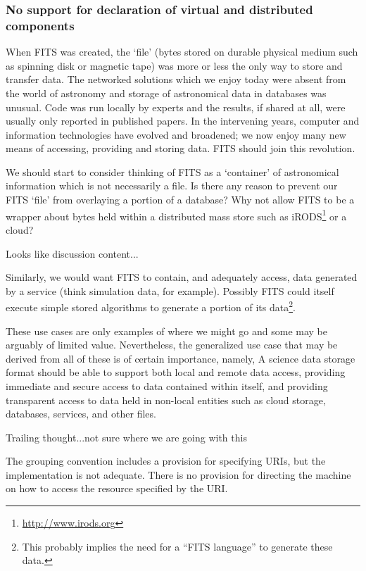 \documentclass[final,authoryear,5p,times,twocolumn]{elsarticle}
\begin{document}
{{\subsubsection{No support for declaration of virtual and distributed components}


When FITS was created, the `file' (bytes stored on durable physical
medium such as spinning disk or magnetic tape) was more or less the
only way to store and transfer data. The networked solutions which we
enjoy today were absent from the world of astronomy and storage of
astronomical data in databases was unusual. Code was run locally by
experts and the results, if shared at all, were usually only reported
in published papers. In the intervening years, computer and
information technologies have evolved and broadened; we now enjoy many
new means of accessing, providing and storing data. FITS should join
this revolution.


We should start to consider thinking of FITS as a `container' of
astronomical information which is not necessarily a file. Is there
any reason to prevent our FITS `file' from overlaying a portion of a
database? Why not allow FITS to be a wrapper about bytes held within a
distributed mass store such as
iRODS\footnote{\url{http://www.irods.org}} \citep[see e.g.,][]{2007AGUFMIN13B1214R}
or a cloud? 
{\color{red} Looks like discussion content...

Similarly, we would
want FITS to contain, and adequately access, data generated by a
service (think simulation data, for example). Possibly FITS could
itself execute simple stored algorithms to generate a portion of its
data\footnote{This probably implies the need for a ``FITS language'' to generate these data.}.
}


These use cases are only examples of where we might go and some may be
arguably of limited value. Nevertheless, the generalized use case that
may be derived from all of these is of certain importance, namely,
A science data storage format should be able to support both local 
and remote data access, providing immediate and secure access to data 
contained within itself, and providing transparent access to data held 
in non-local entities such as cloud storage, databases, services, and 
other files.

{\color{red} Trailing thought...not sure where we are going with this

The grouping convention includes a provision for specifying URIs,
but the implementation is not adequate. There is no provision for
directing the machine on how to access the resource specified by the
URI.
}


}}
\end{document}

